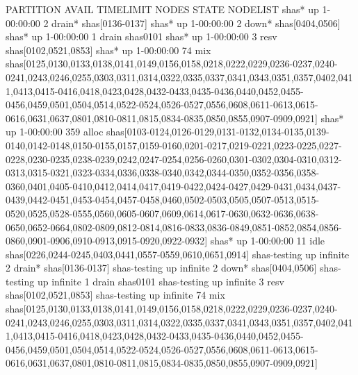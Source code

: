 \documentclass[]{krantz}
\makeatletter
\newenvironment{Shaded}{\begin{snugshade}}{\end{snugshade}}
\newcommand{\ExtensionTok}[1]{#1}
\newcommand{\NormalTok}[1]{#1}
\newenvironment{kframe}{%
\medskip{}
\setlength{\fboxsep}{.8em}
 \def\at@end@of@kframe{}%
 \ifinner\ifhmode%
  \def\at@end@of@kframe{\end{minipage}}%
  \begin{minipage}{\columnwidth}%
 \fi\fi%
 \def\FrameCommand##1{\hskip\@totalleftmargin \hskip-\fboxsep
 \colorbox{shadecolor}{##1}\hskip-\fboxsep
     \hskip-\linewidth \hskip-\@totalleftmargin \hskip\columnwidth}%
 \MakeFramed {\advance\hsize-\width
   \@totalleftmargin\z@ \linewidth\hsize
   \@setminipage}}%
 {\par\unskip\endMakeFramed%
 \at@end@of@kframe}
\renewenvironment{Shaded}{\begin{kframe}}{\end{kframe}}
\makeatother
\begin{document}
\begin{Shaded}
\begin{Highlighting}[]
\ExtensionTok{%
\ExtensionTok{PARTITION}\NormalTok{        AVAIL  TIMELIMIT  NODES  STATE NODELIST}
\ExtensionTok{shas*}\NormalTok{               up 1-00:00:00      2 drain* shas[0136-0137]}
\ExtensionTok{shas*}\NormalTok{               up 1-00:00:00      2  down* shas[0404,0506]}
\ExtensionTok{shas*}\NormalTok{               up 1-00:00:00      1  drain shas0101}
\ExtensionTok{shas*}\NormalTok{               up 1-00:00:00      3   resv shas[0102,0521,0853]}
\ExtensionTok{shas*}\NormalTok{               up 1-00:00:00     74    mix shas[0125,0130,0133,0138,0141,0149,0156,0158,0218,0222,0229,0236-0237,0240-0241,0243,0246,0255,0303,0311,0314,0322,0335,0337,0341,0343,0351,0357,0402,0411,0413,0415-0416,0418,0423,0428,0432-0433,0435-0436,0440,0452,0455-0456,0459,0501,0504,0514,0522-0524,0526-0527,0556,0608,0611-0613,0615-0616,0631,0637,0801,0810-0811,0815,0834-0835,0850,0855,0907-0909,0921]}
\ExtensionTok{shas*}\NormalTok{               up 1-00:00:00    359  alloc shas[0103-0124,0126-0129,0131-0132,0134-0135,0139-0140,0142-0148,0150-0155,0157,0159-0160,0201-0217,0219-0221,0223-0225,0227-0228,0230-0235,0238-0239,0242,0247-0254,0256-0260,0301-0302,0304-0310,0312-0313,0315-0321,0323-0334,0336,0338-0340,0342,0344-0350,0352-0356,0358-0360,0401,0405-0410,0412,0414,0417,0419-0422,0424-0427,0429-0431,0434,0437-0439,0442-0451,0453-0454,0457-0458,0460,0502-0503,0505,0507-0513,0515-0520,0525,0528-0555,0560,0605-0607,0609,0614,0617-0630,0632-0636,0638-0650,0652-0664,0802-0809,0812-0814,0816-0833,0836-0849,0851-0852,0854,0856-0860,0901-0906,0910-0913,0915-0920,0922-0932]}
\ExtensionTok{shas*}\NormalTok{               up 1-00:00:00     11   idle shas[0226,0244-0245,0403,0441,0557-0559,0610,0651,0914]}
\ExtensionTok{shas-testing}\NormalTok{        up   infinite      2 drain* shas[0136-0137]}
\ExtensionTok{shas-testing}\NormalTok{        up   infinite      2  down* shas[0404,0506]}
\ExtensionTok{shas-testing}\NormalTok{        up   infinite      1  drain shas0101}
\ExtensionTok{shas-testing}\NormalTok{        up   infinite      3   resv shas[0102,0521,0853]}
\ExtensionTok{shas-testing}\NormalTok{        up   infinite     74    mix shas[0125,0130,0133,0138,0141,0149,0156,0158,0218,0222,0229,0236-0237,0240-0241,0243,0246,0255,0303,0311,0314,0322,0335,0337,0341,0343,0351,0357,0402,0411,0413,0415-0416,0418,0423,0428,0432-0433,0435-0436,0440,0452,0455-0456,0459,0501,0504,0514,0522-0524,0526-0527,0556,0608,0611-0613,0615-0616,0631,0637,0801,0810-0811,0815,0834-0835,0850,0855,0907-0909,0921]}
}
\end{Highlighting}
\end{Shaded}
\end{document}
